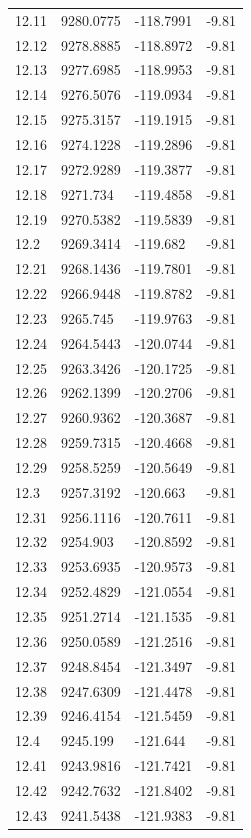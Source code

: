 \begin{table}[H]
\begin{tabular}{llll}
12.11 & 9280.0775 & -118.7991 & -9.81 \\
12.12 & 9278.8885 & -118.8972 & -9.81 \\
12.13 & 9277.6985 & -118.9953 & -9.81 \\
12.14 & 9276.5076 & -119.0934 & -9.81 \\
12.15 & 9275.3157 & -119.1915 & -9.81 \\
12.16 & 9274.1228 & -119.2896 & -9.81 \\
12.17 & 9272.9289 & -119.3877 & -9.81 \\
12.18 & 9271.734 & -119.4858 & -9.81 \\
12.19 & 9270.5382 & -119.5839 & -9.81 \\
12.2 & 9269.3414 & -119.682 & -9.81 \\
12.21 & 9268.1436 & -119.7801 & -9.81 \\
12.22 & 9266.9448 & -119.8782 & -9.81 \\
12.23 & 9265.745 & -119.9763 & -9.81 \\
12.24 & 9264.5443 & -120.0744 & -9.81 \\
12.25 & 9263.3426 & -120.1725 & -9.81 \\
12.26 & 9262.1399 & -120.2706 & -9.81 \\
12.27 & 9260.9362 & -120.3687 & -9.81 \\
12.28 & 9259.7315 & -120.4668 & -9.81 \\
12.29 & 9258.5259 & -120.5649 & -9.81 \\
12.3 & 9257.3192 & -120.663 & -9.81 \\
12.31 & 9256.1116 & -120.7611 & -9.81 \\
12.32 & 9254.903 & -120.8592 & -9.81 \\
12.33 & 9253.6935 & -120.9573 & -9.81 \\
12.34 & 9252.4829 & -121.0554 & -9.81 \\
12.35 & 9251.2714 & -121.1535 & -9.81 \\
12.36 & 9250.0589 & -121.2516 & -9.81 \\
12.37 & 9248.8454 & -121.3497 & -9.81 \\
12.38 & 9247.6309 & -121.4478 & -9.81 \\
12.39 & 9246.4154 & -121.5459 & -9.81 \\
12.4 & 9245.199 & -121.644 & -9.81 \\
12.41 & 9243.9816 & -121.7421 & -9.81 \\
12.42 & 9242.7632 & -121.8402 & -9.81 \\
12.43 & 9241.5438 & -121.9383 & -9.81 \\

\end{tabular}
\end{table}
